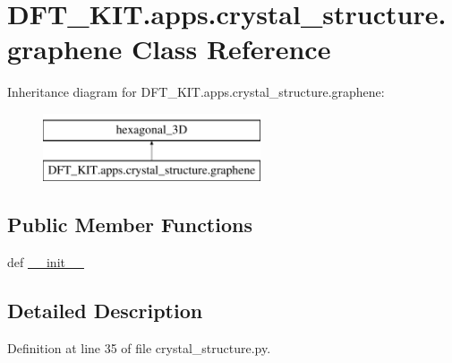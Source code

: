 \hypertarget{class_d_f_t___k_i_t_1_1apps_1_1crystal__structure_1_1graphene}{\section{D\+F\+T\+\_\+\+K\+I\+T.\+apps.\+crystal\+\_\+structure.\+graphene Class Reference}
\label{class_d_f_t___k_i_t_1_1apps_1_1crystal__structure_1_1graphene}
}
Inheritance diagram for D\+F\+T\+\_\+\+K\+I\+T.\+apps.\+crystal\+\_\+structure.\+graphene\+:\begin{figure}[H]
\begin{center}
\leavevmode
\includegraphics[height=2.000000cm]{class_d_f_t___k_i_t_1_1apps_1_1crystal__structure_1_1graphene}
\end{center}
\end{figure}
\subsection*{Public Member Functions}
\begin{DoxyCompactItemize}
\item 
def \hyperlink{class_d_f_t___k_i_t_1_1apps_1_1crystal__structure_1_1graphene_a70c251011fedfe4b3350b18405a67c5b}{\+\_\+\+\_\+init\+\_\+\+\_\+}
\end{DoxyCompactItemize}


\subsection{Detailed Description}


Definition at line 35 of file crystal\+\_\+structure.\+py.



